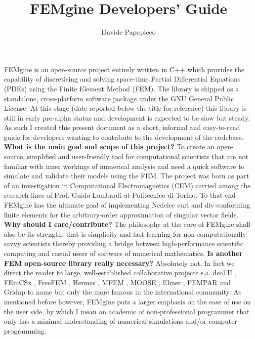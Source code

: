 \documentclass[11pt]{article}
\begin{document}
\title{FEMgine Developers' Guide}
\author{Davide Papapicco}

\maketitle

FEMgine is an open-source project entirely written in C++ which provides the capability of discretising and solving space-time Partial Differential Equations (PDEs) using the Finite Element Method (FEM). The library is shipped as a standalone, cross-platform software package under the GNU General Public License. At this stage (date reported below the title for reference) this library is still in early pre-alpha status and development is expected to be slow but steady. As such I created this present document as a short, informal and easy-to-read guide for developers wanting to contribute to the development of the codebase. 
\newline
\newline
\noindent
\textbf{What is the main goal and scope of this project?} To create an open-source, simplified and user-friendly tool for computational scientists that are not familiar with inner workings of numerical analysis and need a quick software to simulate and validate their models using the FEM. The project was born as part of an investigation in Computational Electromagnetics (CEM) carried among the research lines of Prof. Guido Lombardi at Politecnico di Torino. To that end FEMgine has the ultimate goal of implementing Nedelec curl and div-conforming finite elements for the arbitrary-order approximation of singular vector fields.
\newline
\newline
\noindent
\textbf{Why should I care/contribute?} The philosophy at the core of FEMgine shall also be its strength, that is simplicity and fast learning for non computationally-savvy scientists thereby providing a bridge between high-performance scientific computing and casual users of software of numerical mathematics. 
\newline
\newline
\noindent
\textbf{Is another FEM open-source library really necessary?} Absolutely not. In fact we direct the reader to large, well-established collaborative projects s.a. deal.II \cite{deal.II}, FEniCSx \cite{Fenics1,Fenics2,Fenics3,Fenics4,Fenics5,Fenics6,Fenics7,Fenics8,Fenics9,Fenics10,Fenics11,Fenics12}, FreeFEM \cite{FreeFEM}, Hermes \cite{Hermes}, MFEM \cite{MFEM}, MOOSE \cite{MOOSE}, Elmer \cite{Elmer}, FEMPAR \cite{FEMPAR} and Gridap \cite{Gridap} to name but only the more famous in the international community. As mentioned before however, FEMgine puts a larger emphasis on the ease of use on the user side, by which I mean an academic of non-professional programmer that only has a minimal understanding of numerical simulations and/or computer programming.
\end{document}
